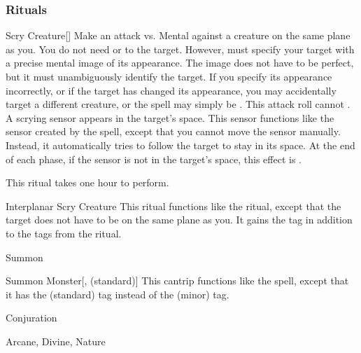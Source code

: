 \subsubsection{Rituals}


\lowercase{\hypertarget{spell:Scry Creature}{}}\label{spell:Scry Creature}
\begin{ability}[\nth{4}]{\hypertarget{spell:Scry Creature}{Scry Creature}}[]
Make an attack vs. Mental against a creature on the same plane as you.
You do not need  or  to the target.
However,  must specify your target with a precise mental image of its appearance.
The image does not have to be perfect, but it must unambiguously identify the target.
If you specify its appearance incorrectly, or if the target has changed its appearance, you may accidentally target a different creature, or the spell may simply be .
This attack roll cannot .
\hit A scrying sensor appears in the target's space.
This sensor functions like the sensor created by the  spell, except that you cannot move the sensor manually.
Instead, it automatically tries to follow the target to stay in its space.
At the end of each phase, if the sensor is not in the target's space, this effect is .

This ritual takes one hour to perform.
\end{ability}
\vspace{0.25em}



\lowercase{\hypertarget{spell:Interplanar Scry Creature}{}}\label{spell:Interplanar Scry Creature}
\begin{ability}[\nth{7}]{\hypertarget{spell:Interplanar Scry Creature}{Interplanar Scry Creature}}
This ritual functions like the  ritual, except that the target does not have to be on the same plane as you.
It gains the  tag in addition to the tags from the  ritual.
\end{ability}
\vspace{0.25em}


\newpage
\begin{spellsection}{Summon}

\begin{spellheader}
\end{spellheader}


\begin{ability}{Summon Monster}[,  (standard)]
This cantrip functions like the  spell, except that it has the  (standard) tag instead of the  (minor) tag.
\end{ability}




 Conjuration

 Arcane, Divine, Nature
\end{spellsection}


